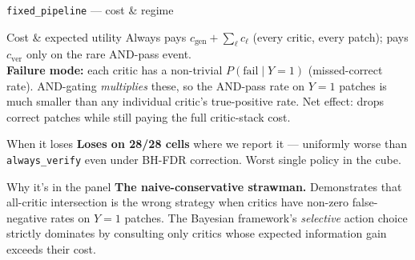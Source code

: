 \documentclass[10pt]{beamer}
\newcommand{\bad}[1]{\textcolor{accentRed}{\textbf{#1}}}
\newcommand{\warn}[1]{\textcolor{accentOrange}{\textbf{#1}}}
\begin{document}
\begin{frame}[fragile]{\texttt{fixed\_pipeline} --- cost \& regime}
\begin{block}{Cost \& expected utility}
\footnotesize
Always pays $c_\text{gen} + \sum_\ell c_\ell$ (every critic, every patch);
pays $c_\text{ver}$ only on the rare AND-pass event.\\[3pt]
\bad{Failure mode:} each critic has a non-trivial $P(\text{fail}\mid Y{=}1)$
(missed-correct rate). AND-gating \emph{multiplies} these, so the AND-pass
rate on $Y{=}1$ patches is much smaller than any individual critic's
true-positive rate. Net effect: drops correct patches while still paying
the full critic-stack cost.
\end{block}

\begin{alertblock}{When it loses}
\bad{Loses on 28/28 cells} where we report it --- uniformly worse than
\texttt{always\_verify} even under BH-FDR correction. Worst single policy
in the cube.
\end{alertblock}

\begin{exampleblock}{Why it's in the panel}
\warn{The naive-conservative strawman.} Demonstrates that all-critic
intersection is the wrong strategy when critics have non-zero
false-negative rates on $Y{=}1$ patches. The Bayesian framework's
\emph{selective} action choice strictly dominates by consulting only
critics whose expected information gain exceeds their cost.
\end{exampleblock}
\end{frame}
\end{document}
